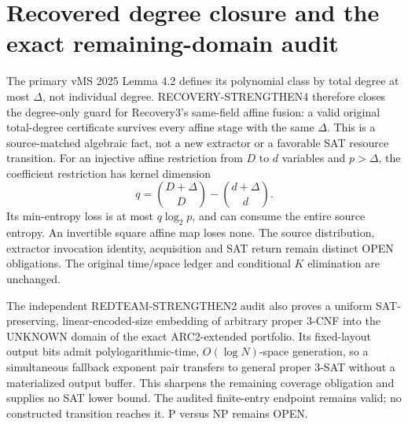\section{Recovered degree closure and the exact remaining-domain audit}
The primary vMS 2025 Lemma 4.2 defines its polynomial class by total
degree at most $\Delta$, not individual degree. RECOVERY-STRENGTHEN4
therefore closes the degree-only guard for Recovery3's same-field affine
fusion: a valid original total-degree certificate survives every affine
stage with the same $\Delta$. This is a source-matched algebraic fact,
not a new extractor or a favorable SAT resource transition.
For an injective affine restriction from $D$ to $d$ variables and
$p>\Delta$, the coefficient restriction has kernel dimension
\[
 q=\binom{D+\Delta}{D}-\binom{d+\Delta}{d}.
\]
Its min-entropy loss is at most $q\log_2p$, and can consume the entire
source entropy. An invertible square affine map loses none. The source
distribution, extractor invocation identity, acquisition and SAT return
remain distinct OPEN obligations. The original time/space ledger and
conditional $K$ elimination are unchanged.

The independent REDTEAM-STRENGTHEN2 audit also proves a uniform
SAT-preserving, linear-encoded-size embedding of arbitrary proper
3-CNF into the UNKNOWN domain of the exact ARC2-extended portfolio.
Its fixed-layout output bits admit polylogarithmic-time,
$O(\log N)$-space generation, so a simultaneous fallback exponent pair
transfers to general proper 3-SAT without a materialized output buffer.
This sharpens the remaining coverage obligation and supplies no SAT
lower bound. The audited finite-entry endpoint remains valid; no
constructed transition reaches it. P versus NP remains OPEN.
